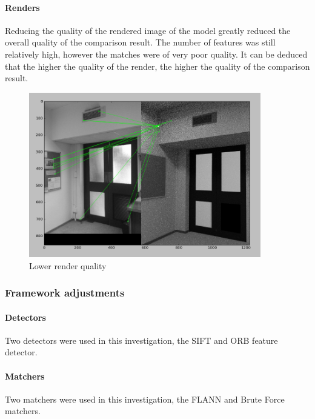 \documentclass[11pt,a4paper]{report}
\begin{document}
				\paragraph{Renders}
					Reducing the quality of the rendered image of the model greatly reduced the overall quality of the comparison result. The number of features was still relatively high, however the matches were of very poor quality. It can be deduced that the higher the quality of the render, the higher the quality of the comparison result.
					\begin{figure}[H]
						\centering
						\includegraphics[width=0.9\textwidth]{low_quality_results}
						\caption{Lower render quality}
						\label{fig:low_quality_results}
					\end{figure}
				
			\subsubsection{Framework adjustments}
				\paragraph{Detectors}
					Two detectors were used in this investigation, the SIFT and ORB feature detector.
				\paragraph{Matchers}
					Two matchers were used in this investigation, the FLANN and Brute Force matchers.
\end{document}

